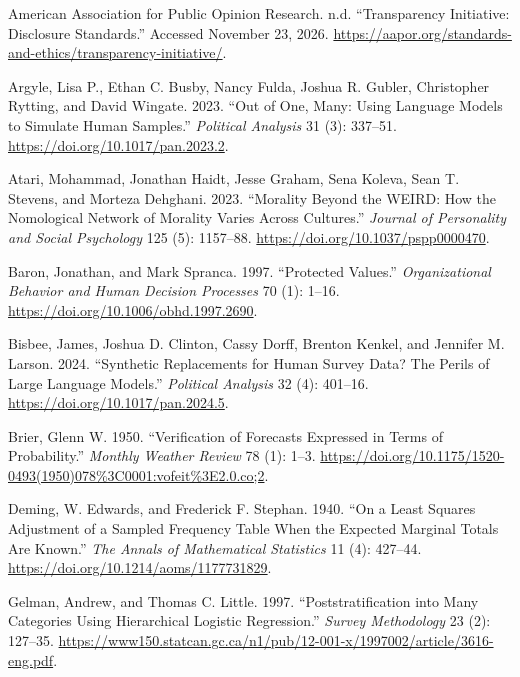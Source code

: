 \documentclass[
  11pt,
]{article}
\newlength{\cslhangindent}
\newenvironment{CSLReferences}[2] %
 {\begin{list}{}{%
  \setlength{\itemindent}{0pt}
  \setlength{\leftmargin}{0pt}
  \setlength{\parsep}{0pt}
  \ifodd #1
   \setlength{\leftmargin}{\cslhangindent}
   \setlength{\itemindent}{-1\cslhangindent}
  \fi
  \setlength{\itemsep}{#2\baselineskip}}}
 {\end{list}}
\begin{document}
\label{refs}
\begin{CSLReferences}{1}{0}
American Association for Public Opinion Research. n.d. {``Transparency
Initiative: Disclosure Standards.''} Accessed November 23, 2026.
\url{https://aapor.org/standards-and-ethics/transparency-initiative/}.

Argyle, Lisa P., Ethan C. Busby, Nancy Fulda, Joshua R. Gubler,
Christopher Rytting, and David Wingate. 2023. {``Out of One, Many: Using
Language Models to Simulate Human Samples.''} \emph{Political Analysis}
31 (3): 337--51. \url{https://doi.org/10.1017/pan.2023.2}.

Atari, Mohammad, Jonathan Haidt, Jesse Graham, Sena Koleva, Sean T.
Stevens, and Morteza Dehghani. 2023. {``Morality Beyond the WEIRD: How
the Nomological Network of Morality Varies Across Cultures.''}
\emph{Journal of Personality and Social Psychology} 125 (5): 1157--88.
\url{https://doi.org/10.1037/pspp0000470}.

Baron, Jonathan, and Mark Spranca. 1997. {``Protected Values.''}
\emph{Organizational Behavior and Human Decision Processes} 70 (1):
1--16. \url{https://doi.org/10.1006/obhd.1997.2690}.

Bisbee, James, Joshua D. Clinton, Cassy Dorff, Brenton Kenkel, and
Jennifer M. Larson. 2024. {``Synthetic Replacements for Human Survey
Data? The Perils of Large Language Models.''} \emph{Political Analysis}
32 (4): 401--16. \url{https://doi.org/10.1017/pan.2024.5}.

Brier, Glenn W. 1950. {``Verification of Forecasts Expressed in Terms of
Probability.''} \emph{Monthly Weather Review} 78 (1): 1--3.
\url{https://doi.org/10.1175/1520-0493(1950)078\%3C0001:vofeit\%3E2.0.co;2}.

Deming, W. Edwards, and Frederick F. Stephan. 1940. {``On a Least
Squares Adjustment of a Sampled Frequency Table When the Expected
Marginal Totals Are Known.''} \emph{The Annals of Mathematical
Statistics} 11 (4): 427--44.
\url{https://doi.org/10.1214/aoms/1177731829}.

Gelman, Andrew, and Thomas C. Little. 1997. {``Poststratification into
Many Categories Using Hierarchical Logistic Regression.''} \emph{Survey
Methodology} 23 (2): 127--35.
\url{https://www150.statcan.gc.ca/n1/pub/12-001-x/1997002/article/3616-eng.pdf}.


\end{CSLReferences}
\end{document}
